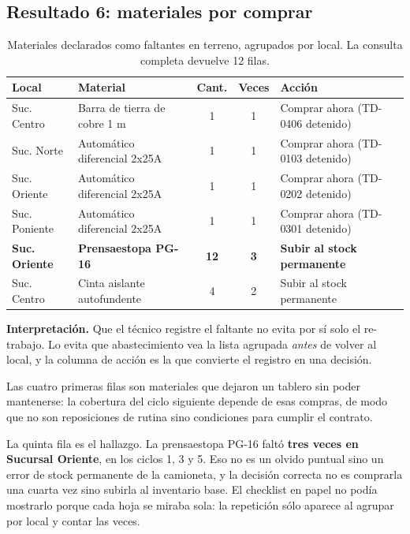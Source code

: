 \documentclass[10pt,letterpaper]{article}
\begin{document}
\subsection{Resultado 6: materiales por comprar}

\begin{table}[H]
\centering
\small
\begin{tabular}{@{}llccl@{}}
\toprule
\textbf{Local} & \textbf{Material} & \textbf{Cant.} & \textbf{Veces} & \textbf{Acción} \\
\midrule
Suc. Centro    & Barra de tierra de cobre 1 m   & 1  & 1 & Comprar ahora (TD-0406 detenido) \\
Suc. Norte     & Automático diferencial 2x25A   & 1  & 1 & Comprar ahora (TD-0103 detenido) \\
Suc. Oriente   & Automático diferencial 2x25A   & 1  & 1 & Comprar ahora (TD-0202 detenido) \\
Suc. Poniente  & Automático diferencial 2x25A   & 1  & 1 & Comprar ahora (TD-0301 detenido) \\
\textbf{Suc. Oriente} & \textbf{Prensaestopa PG-16} & \textbf{12} & \textbf{3} & \textbf{Subir al stock permanente} \\
Suc. Centro    & Cinta aislante autofundente    & 4  & 2 & Subir al stock permanente \\
\bottomrule
\end{tabular}
\caption{Materiales declarados como faltantes en terreno, agrupados por local.
La consulta completa devuelve 12 filas.}
\end{table}

\textbf{Interpretación.} Que el técnico registre el faltante no evita por sí
solo el re-trabajo. Lo evita que abastecimiento vea la lista agrupada
\emph{antes} de volver al local, y la columna de acción es la que convierte el
registro en una decisión.

Las cuatro primeras filas son materiales que dejaron un tablero sin poder
mantenerse: la cobertura del ciclo siguiente depende de esas compras, de modo
que no son reposiciones de rutina sino condiciones para cumplir el contrato.

La quinta fila es el hallazgo. La prensaestopa PG-16 faltó \textbf{tres veces
en Sucursal Oriente}, en los ciclos 1, 3 y 5. Eso no es un olvido puntual sino
un error de stock permanente de la camioneta, y la decisión correcta no es
comprarla una cuarta vez sino subirla al inventario base. El checklist en papel
no podía mostrarlo porque cada hoja se miraba sola: la repetición sólo aparece
al agrupar por local y contar las veces.
\end{document}
